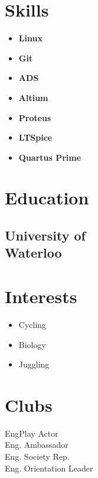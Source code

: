 \documentclass[]{chandan-cv}
\begin{document}
\begin{minipage}[t]{0.23\textwidth}

\section{Skills}
	\begin{itemize}
		\setlength\itemsep{-0.17em}
		\item \textbf{Linux}
		\item \textbf{Git}
		\item \textbf{ADS}
		\item \textbf{Altium}
		\item \textbf{Proteus}
		\item \textbf{LTSpice}
		\item \textbf{Quartus Prime}
	\end{itemize}

\section{Education}

\subsection{University of \\
Waterloo}

\section{Interests}
\begin{itemize}
	\setlength\itemsep{-0.3em}
    \item Cycling
	\item Biology
	\item Juggling
\end{itemize}

\section{Clubs}
EngPlay Actor \\
Eng. Ambassador \\
Eng. Society Rep.\\
Eng. Orientation Leader

\sectionsep


%
%

\end{minipage}
\end{document}
